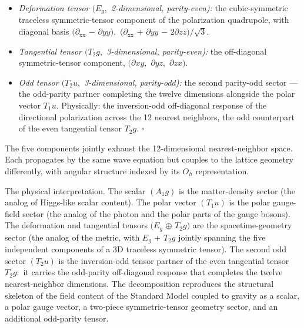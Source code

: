 \documentclass[11pt,oneside]{report}
\theoremstyle{definition}
\theoremstyle{remark}
\begin{document}
\begin{itemize}
\item
  \emph{Deformation tensor \ensuremath{(E_{g},} 2-dimensional, parity-even):} the
  cubic-symmetric traceless symmetric-tensor component of the
  polarization quadrupole, with diagonal basis \ensuremath{(\partial _{\mathrm{xx}}} \ensuremath{-} \ensuremath{\partial yy),} \ensuremath{(\partial _{\mathrm{xx}}} + \ensuremath{\partial yy} \ensuremath{-}
  \ensuremath{2\partial zz)/\sqrt{3}.}
\end{itemize}

\begin{itemize}
\item
  \emph{Tangential tensor \ensuremath{(T_{2}g,} 3-dimensional, parity-even):} the
  off-diagonal symmetric-tensor component, \ensuremath{(\partial xy,} \ensuremath{\partial yz,} \ensuremath{\partial zx).}
\end{itemize}

\begin{itemize}
\item
  \emph{Odd tensor \ensuremath{(T_{2}u,} 3-dimensional, parity-odd):} the second
  parity-odd sector --- the odd-parity partner completing the twelve
  dimensions alongside the polar vector \ensuremath{T_{1}u.} Physically: the
  inversion-odd off-diagonal response of the directional polarization
  across the 12 nearest neighbors, the odd counterpart of the even
  tangential tensor \ensuremath{T_{2}g.} \ensuremath{\square}
\end{itemize}

The five components jointly exhaust the 12-dimensional nearest-neighbor
space. Each propagates by the same wave equation but couples to the
lattice geometry differently, with angular structure indexed by its \ensuremath{O_{h}}
representation.

The physical interpretation. The scalar \ensuremath{(A_{1}g)} is the matter-density
sector (the analog of Higgs-like scalar content). The polar vector \ensuremath{(T_{1}u)}
is the polar gauge-field sector (the analog of the photon and the polar
parts of the gauge bosons). The deformation and tangential tensors \ensuremath{(E_{g}}
\ensuremath{\oplus} \ensuremath{T_{2}g)} are the spacetime-geometry sector (the analog of the metric, with
\ensuremath{E_{g}} + \ensuremath{T_{2}g} jointly spanning the five independent components of a 3D
traceless symmetric tensor). The second odd sector \ensuremath{(T_{2}u)} is the
inversion-odd tensor partner of the even tangential tensor \ensuremath{T_{2}g:} it
carries the odd-parity off-diagonal response that completes the twelve
nearest-neighbor dimensions. The decomposition reproduces the structural
skeleton of the field content of the Standard Model coupled to gravity as
a scalar, a polar gauge vector, a two-piece symmetric-tensor geometry
sector, and an additional odd-parity tensor.
\end{document}
